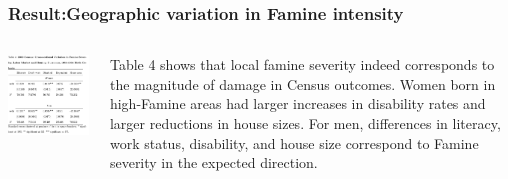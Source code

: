 \documentclass{beamer}
\begin{document}
\begin{frame}
\frametitle{Result:Geographic variation in Famine intensity}
    \begin{columns}
            \begin{minipage}[c][0.4\textheight][c]{\linewidth}
                \centering
                \includegraphics[width=1\linewidth]{table4}
            \end{minipage}
           
            \begin{minipage}[c][0.4\textheight][c]{\linewidth}
            Table 4 shows that local famine severity indeed corresponds to the magnitude of damage in Census outcomes. Women born in high-Famine areas had larger increases in disability rates and larger reductions in house sizes. For men, diﬀerences in literacy, work status, disability, and house size correspond to Famine severity in the expected direction.
            \end{minipage}
    \end{columns}
\end{frame}
\end{document}
